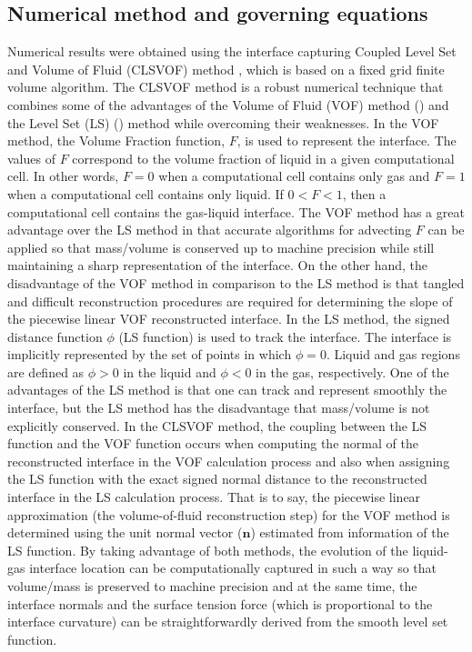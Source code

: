 \documentclass[review]{elsarticle}
\begin{document}
\subsection{Numerical method and governing equations}
Numerical results were obtained using the interface capturing
Coupled Level Set and Volume of Fluid (CLSVOF) method
\cite{SusPuc00,SUSSMAN2007469}, which is based on a fixed grid finite volume
algorithm.  The CLSVOF method is a robust  numerical  technique
that  combines  some  of  the  advantages  of the Volume of Fluid (VOF) method
(\cite{HirNic81}) and the Level Set (LS) (\cite{SusSmeOsh94}) method while
overcoming their weaknesses.  In the VOF method,  the Volume Fraction function,
$F$, is used to represent the interface. The values of $F$ correspond to the
volume fraction of liquid in a given computational cell.  In other words, $F =
0$ when a computational cell contains only gas and $F = 1$ when a computational
cell contains only liquid.  If $0 < F < 1$, then a computational cell contains
the gas-liquid interface. The VOF method has a great advantage over the LS
method in that accurate algorithms for advecting $F$ can be applied so that
mass/volume is conserved up to machine precision while still maintaining a
sharp representation of the interface.  On the other hand, the disadvantage of
the VOF method in comparison to the LS method is that tangled and difficult
reconstruction procedures are required for determining the slope of the
piecewise linear VOF reconstructed interface.  In the LS method, the signed
distance function $\phi$ (LS function) is used to track the interface. The
interface is implicitly represented by the set of points in which $\phi = 0$.
Liquid and gas regions are defined as $\phi > 0$ in the liquid and $\phi < 0$
in the gas, respectively.  One of the advantages of the LS method is that one
can track and represent smoothly the interface, but the LS method has the
disadvantage that mass/volume is not explicitly conserved.  In the CLSVOF
method, the coupling between the LS function and the VOF function occurs when
computing the normal of the reconstructed interface in the VOF calculation
process and also when assigning the LS function with the exact signed normal
distance to the reconstructed interface in the LS calculation process. That is
to say, the piecewise linear approximation (the volume-of-fluid reconstruction
step) for the VOF method is determined using the unit normal vector ($\bm n$)
estimated from information of the LS function. By taking advantage of both
methods, the evolution of the liquid-gas interface location can be
computationally captured in such a way so that volume/mass is preserved to
machine precision and at the same time, the interface normals and the surface
tension force (which is proportional to the interface curvature) can be
straightforwardly derived from the smooth level set function.
\end{document}
